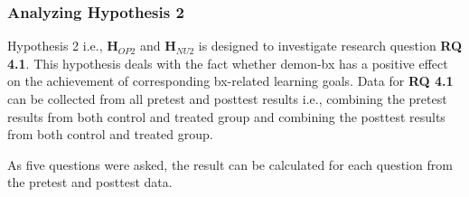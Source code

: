 \subsubsection{Analyzing Hypothesis 2}\label{subsubsec:hypothesis2}
Hypothesis 2 i.e., \textbf{H$_{OP2}$} and \textbf{H$_{NU2}$} is designed to investigate research question \textbf{RQ 4.1}. This hypothesis deals with the fact whether demon-bx has a positive effect on the achievement of corresponding bx-related learning goals. Data for \textbf{RQ 4.1} can be collected from all pretest and posttest results i.e., combining the pretest results from both control and treated group and combining the posttest results from both control and treated group. 

As five questions were asked, the result can be calculated for each question from the pretest and posttest data. 

